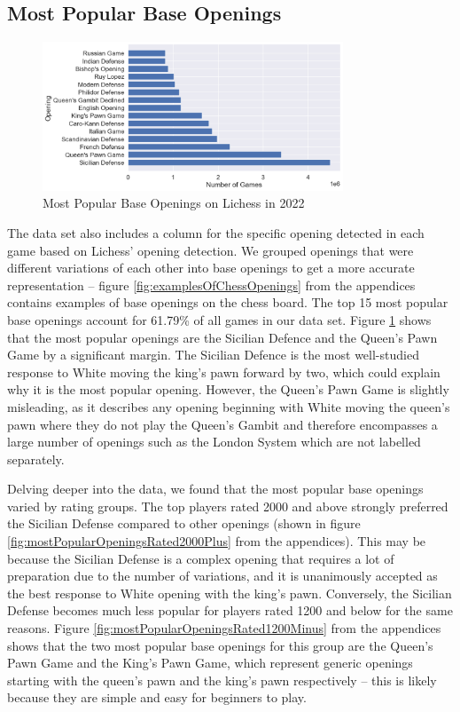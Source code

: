 \documentclass[a4paper, 11pt]{article}
\begin{document}
\subsection{Most Popular Base Openings}
\begin{figure}[H]
    \centering
    \caption{Most Popular Base Openings on Lichess in 2022}
    \label{fig:mostPopularOpenings}
    \includegraphics[width=0.8\textwidth]{Most Popular Base Openings.png}
\end{figure}

The data set also includes a column for the specific opening detected in each game based on Lichess' opening detection. We grouped openings that were different variations of each other into base openings to get a more accurate representation -- figure \ref{fig:examplesOfChessOpenings} from the appendices contains examples of base openings on the chess board. The top 15 most popular base openings account for 61.79\% of all games in our data set. Figure \ref{fig:mostPopularOpenings} shows that the most popular openings are the Sicilian Defence and the Queen's Pawn Game by a significant margin. The Sicilian Defence is the most well-studied response to White moving the king's pawn forward by two, which could explain why it is the most popular opening. However, the Queen's Pawn Game is slightly misleading, as it describes any opening beginning with White moving the queen's pawn where they do not play the Queen's Gambit and therefore encompasses a large number of openings such as the London System which are not labelled separately.

Delving deeper into the data, we found that the most popular base openings varied by rating groups. The top players rated 2000 and above strongly preferred the Sicilian Defense compared to other openings (shown in figure \ref{fig:mostPopularOpeningsRated2000Plus} from the appendices). This may be because the Sicilian Defense is a complex opening that requires a lot of preparation due to the number of variations, and it is unanimously accepted as the best response to White opening with the king's pawn. Conversely, the Sicilian Defense becomes much less popular for players rated 1200 and below for the same reasons. Figure \ref{fig:mostPopularOpeningsRated1200Minus} from the appendices shows that the two most popular base openings for this group are the Queen's Pawn Game and the King's Pawn Game, which represent generic openings starting with the queen's pawn and the king's pawn respectively -- this is likely because they are simple and easy for beginners to play.
\end{document}
